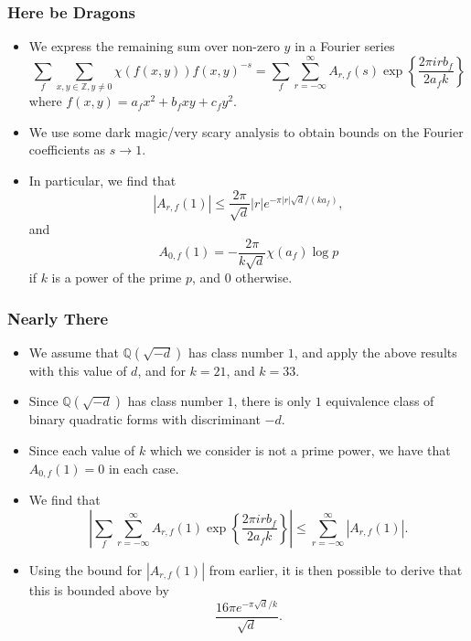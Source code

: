 \documentclass{beamer}
\begin{document}
\begin{frame}
	
	\frametitle{Here be Dragons}

	\begin{itemize}

		\item We express the remaining sum over non-zero $y$ in a Fourier series
			\[
				\sum_{f} \sum_{x, y \in \mathbb{Z}, y \neq 0} \chi (f(x, y)) {f(x, y)}^{-s} = \sum_{f} \sum_{r = -\infty}^{\infty} A_{r, f}(s) \exp\left\{\frac{2 \pi i r b_f}{2 a_f k} \right\}
			\]
			where $f(x, y) = a_f x^2 + b_f xy + c_f y^2$. \pause

		\item We use some dark magic/very scary analysis to obtain bounds on the Fourier coefficients as $s \to 1$. \pause

		\item In particular, we find that
			\[
				|A_{r, f}(1)| \leq \frac{2 \pi}{\sqrt{d}} |r| e^{-\pi |r| \sqrt{d} / (k a_f)},
			\]
			and
			\[
				A_{0, f}(1) = - \frac{2 \pi}{k \sqrt{d}} \chi(a_f) \log p
			\]
			if $k$ is a power of the prime $p$, and $0$ otherwise.

	\end{itemize}

\end{frame}

\begin{frame}

	\frametitle{Nearly There}

	\begin{itemize}
		
		\item We assume that $\mathbb{Q}(\sqrt{-d})$ has class number $1$, and apply the above results with this value of $d$, and for $k = 21$, and $k = 33$. \pause

		\item Since $\mathbb{Q}(\sqrt{-d})$ has class number $1$, there is only $1$ equivalence class of binary quadratic forms with discriminant $-d$. \pause

		\item Since each value of $k$ which we consider is not a prime power, we have that $A_{0, f}(1) = 0$ in each case. \pause

		\item We find that
			\[
			\left| \sum_{f} \sum_{r = -\infty}^{\infty} A_{r, f}(1) \exp\left\{\frac{2 \pi i r b_f}{2 a_f k} \right\} \right| \leq \sum_{r = -\infty}^{\infty} |A_{r, f}(1)|.
			\]
			\pause

		\item Using the bound for $|A_{r, f}(1)|$ from earlier, it is then possible to derive that this is bounded above by
			\[
				\frac{16 \pi e^{- \pi \sqrt{d} / k}}{\sqrt{d}}.
			\]
			\pause

	\end{itemize}

\end{frame}
\end{document}
